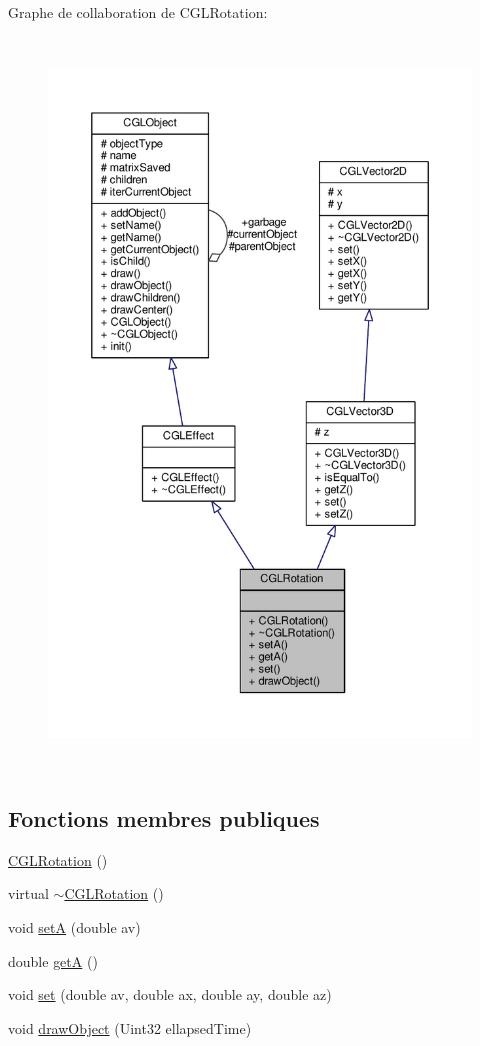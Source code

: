 Graphe de collaboration de C\-G\-L\-Rotation\-:\nopagebreak
\begin{figure}[H]
\begin{center}
\leavevmode
\includegraphics[height=550pt]{d0/db1/class_c_g_l_rotation__coll__graph}
\end{center}
\end{figure}
\subsection*{Fonctions membres publiques}
\begin{DoxyCompactItemize}
\item 
\hyperlink{class_c_g_l_rotation_a00f328e9aeefa148e4bd169afc5cb959}{C\-G\-L\-Rotation} ()
\item 
virtual \hyperlink{class_c_g_l_rotation_adc90213d4008b9beb3c8e266f952a509}{$\sim$\-C\-G\-L\-Rotation} ()
\item 
void \hyperlink{class_c_g_l_rotation_a690f30f8f121b27ac22d6b02a6443b58}{set\-A} (double av)
\item 
double \hyperlink{class_c_g_l_rotation_a0d836220b7b39ee00173ee4e0bb4da92}{get\-A} ()
\item 
void \hyperlink{class_c_g_l_rotation_a2b767e088f36ceef91e7259c76f7390e}{set} (double av, double ax, double ay, double az)
\item 
void \hyperlink{class_c_g_l_rotation_a94be2c089fbe52d0f8cb33ee98f8de74}{draw\-Object} (Uint32 ellapsed\-Time)
\end{DoxyCompactItemize}
